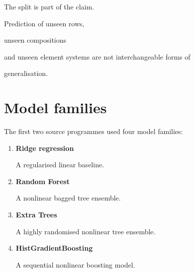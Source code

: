 \documentclass[11pt,a4paper,oneside]{report}
\providecommand{\term}[1]{\textbf{#1}}
\begin{document}
\begin{governingrule}



The split is part of the claim.



Prediction of unseen rows,

unseen compositions

and unseen element systems are not interchangeable forms of

generalisation.



\end{governingrule}





\section{Model families}



The first two source programmes used four model families:



\begin{enumerate}



\item

\term{Ridge regression}



A regularised linear baseline.



\item

\term{Random Forest}



A nonlinear bagged tree ensemble.



\item

\term{Extra Trees}



A highly randomised nonlinear tree ensemble.



\item

\term{HistGradientBoosting}



A sequential nonlinear boosting model.



\end{enumerate}
\end{document}
